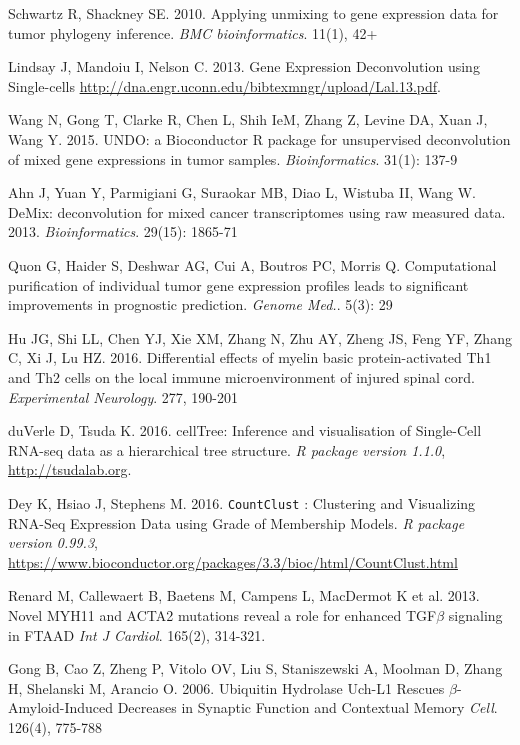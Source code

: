 \documentclass[10pt,letterpaper]{article}
\begin{document}
\begin{thebibliography}{9}
 Schwartz R, Shackney SE. 2010.
 Applying unmixing to gene expression data for tumor phylogeny inference.
 \textit{BMC bioinformatics}.  11(1), 42+

 Lindsay J,  Mandoiu I, Nelson C. 2013.
 Gene Expression Deconvolution using Single-cells
 \url{http://dna.engr.uconn.edu/bibtexmngr/upload/Lal.13.pdf}.

 Wang N, Gong T, Clarke R, Chen L, Shih IeM, Zhang Z, Levine DA, Xuan J, Wang Y.  2015.
 UNDO: a Bioconductor R package for unsupervised deconvolution of mixed gene expressions in tumor samples.
\textit{Bioinformatics}. 31(1): 137-9

Ahn J, Yuan Y, Parmigiani G, Suraokar MB, Diao L, Wistuba II, Wang W.
DeMix: deconvolution for mixed cancer transcriptomes using raw measured data. 2013.
\textit{Bioinformatics}. 29(15): 1865-71

Quon G, Haider S, Deshwar AG, Cui A, Boutros PC, Morris Q.
Computational purification of individual tumor gene expression profiles leads to significant improvements in prognostic prediction.
\textit{Genome Med.}. 5(3): 29


 Hu JG,  Shi LL,  Chen YJ,  Xie XM,  Zhang N,  Zhu AY,  Zheng JS,  Feng YF,  Zhang C,  Xi J,  Lu HZ. 2016.
 Differential effects of myelin basic protein-activated Th1 and Th2 cells on the local immune microenvironment of injured spinal cord.
 \textit{Experimental Neurology}. 277, 190-201

 duVerle D, Tsuda K. 2016.
 cellTree: Inference and visualisation of Single-Cell RNA-seq data as a hierarchical tree structure.
 \textit{R package version 1.1.0}, \url{http://tsudalab.org}.

 Dey K, Hsiao J, Stephens M. 2016.
{\tt CountClust} : Clustering and Visualizing RNA-Seq Expression Data using Grade of Membership Models.
 \textit{R package version 0.99.3}, \url{https://www.bioconductor.org/packages/3.3/bioc/html/CountClust.html}

 Renard M,  Callewaert B,  Baetens M,  Campens L,  MacDermot K et al. 2013.
 Novel MYH11 and ACTA2 mutations reveal a role for enhanced TGF$\beta$ signaling in FTAAD
 \textit{Int J Cardiol}. 165(2), 314-321.

 Gong B,  Cao Z,  Zheng P,  Vitolo OV,  Liu S,  Staniszewski A,  Moolman D,  Zhang H,  Shelanski M,  Arancio O. 2006.
 Ubiquitin Hydrolase Uch-L1 Rescues $\beta$-Amyloid-Induced Decreases in Synaptic Function and Contextual Memory
 \textit{Cell}. 126(4), 775-788


\end{thebibliography}
\end{document}
